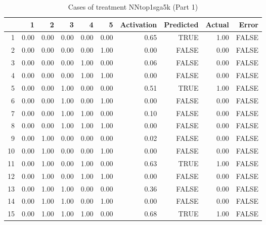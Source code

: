 \begin{table}[ht]
\centering
\begin{tabular}{rrrrrrrrrr}
  \hline
 & 1 & 2 & 3 & 4 & 5 & Activation & Predicted & Actual & Error \\ 
  \hline
1 & 0.00 & 0.00 & 0.00 & 0.00 & 0.00 & 0.65 & TRUE & 1.00 & FALSE \\ 
  2 & 0.00 & 0.00 & 0.00 & 0.00 & 1.00 & 0.00 & FALSE & 0.00 & FALSE \\ 
  3 & 0.00 & 0.00 & 0.00 & 1.00 & 0.00 & 0.06 & FALSE & 0.00 & FALSE \\ 
  4 & 0.00 & 0.00 & 0.00 & 1.00 & 1.00 & 0.00 & FALSE & 0.00 & FALSE \\ 
  5 & 0.00 & 0.00 & 1.00 & 0.00 & 0.00 & 0.51 & TRUE & 1.00 & FALSE \\ 
  6 & 0.00 & 0.00 & 1.00 & 0.00 & 1.00 & 0.00 & FALSE & 0.00 & FALSE \\ 
  7 & 0.00 & 0.00 & 1.00 & 1.00 & 0.00 & 0.10 & FALSE & 0.00 & FALSE \\ 
  8 & 0.00 & 0.00 & 1.00 & 1.00 & 1.00 & 0.00 & FALSE & 0.00 & FALSE \\ 
  9 & 0.00 & 1.00 & 0.00 & 0.00 & 0.00 & 0.02 & FALSE & 0.00 & FALSE \\ 
  10 & 0.00 & 1.00 & 0.00 & 0.00 & 1.00 & 0.00 & FALSE & 0.00 & FALSE \\ 
  11 & 0.00 & 1.00 & 0.00 & 1.00 & 0.00 & 0.63 & TRUE & 1.00 & FALSE \\ 
  12 & 0.00 & 1.00 & 0.00 & 1.00 & 1.00 & 0.00 & FALSE & 0.00 & FALSE \\ 
  13 & 0.00 & 1.00 & 1.00 & 0.00 & 0.00 & 0.36 & FALSE & 0.00 & FALSE \\ 
  14 & 0.00 & 1.00 & 1.00 & 0.00 & 1.00 & 0.00 & FALSE & 0.00 & FALSE \\ 
  15 & 0.00 & 1.00 & 1.00 & 1.00 & 0.00 & 0.68 & TRUE & 1.00 & FALSE \\ 
   \hline
\end{tabular}
\caption{Cases of treatment NNtop1sga5k (Part 1)} 
\end{table}
